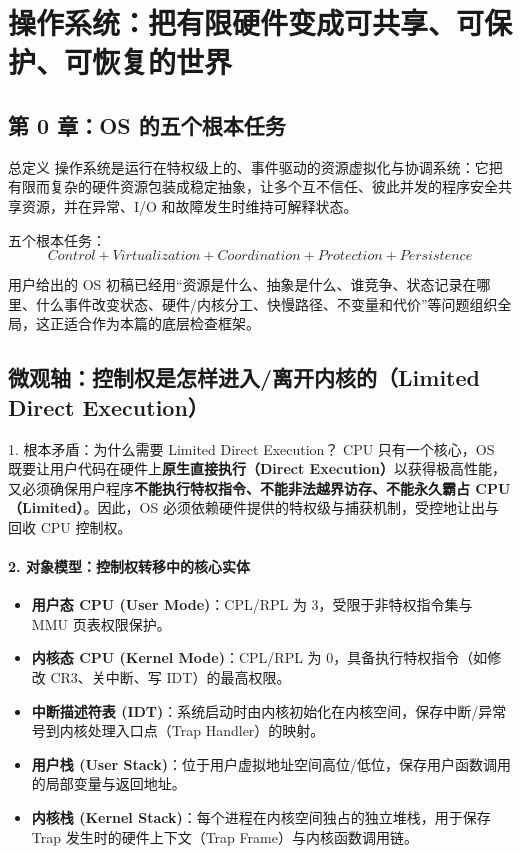 \documentclass[11pt,a4paper,openany]{ctexbook}
\newcommand{\key}[1]{\textbf{\color{deep}#1}}
\begin{document}
\chapter{操作系统：把有限硬件变成可共享、可保护、可恢复的世界}

\section{第 0 章：OS 的五个根本任务}
\begin{corebox}{总定义}
操作系统是运行在特权级上的、事件驱动的资源虚拟化与协调系统：它把有限而复杂的硬件资源包装成稳定抽象，让多个互不信任、彼此并发的程序安全共享资源，并在异常、I/O 和故障发生时维持可解释状态。
\end{corebox}

五个根本任务：
\[
\boxed{Control+Virtualization+Coordination+Protection+Persistence}
\]

用户给出的 OS 初稿已经用“资源是什么、抽象是什么、谁竞争、状态记录在哪里、什么事件改变状态、硬件/内核分工、快慢路径、不变量和代价”等问题组织全局，这正适合作为本篇的底层检查框架。

\section{微观轴：控制权是怎样进入/离开内核的（Limited Direct Execution）}

\begin{corebox}{1. 根本矛盾：为什么需要 Limited Direct Execution？}
CPU 只有一个核心，OS 既要让用户代码在硬件上\textbf{原生直接执行（Direct Execution）}以获得极高性能，又必须确保用户程序\textbf{不能执行特权指令、不能非法越界访存、不能永久霸占 CPU（Limited）}。因此，OS 必须依赖硬件提供的特权级与捕获机制，受控地让出与回收 CPU 控制权。
\end{corebox}

\subsubsection*{2. 对象模型：控制权转移中的核心实体}
\begin{itemize}
  \item \key{用户态 CPU (User Mode)}：CPL/RPL 为 3，受限于非特权指令集与 MMU 页表权限保护。
  \item \key{内核态 CPU (Kernel Mode)}：CPL/RPL 为 0，具备执行特权指令（如修改 CR3、关中断、写 IDT）的最高权限。
  \item \key{中断描述符表 (IDT)}：系统启动时由内核初始化在内核空间，保存中断/异常号到内核处理入口点（Trap Handler）的映射。
  \item \key{用户栈 (User Stack)}：位于用户虚拟地址空间高位/低位，保存用户函数调用的局部变量与返回地址。
  \item \key{内核栈 (Kernel Stack)}：每个进程在内核空间独占的独立堆栈，用于保存 Trap 发生时的硬件上下文（Trap Frame）与内核函数调用链。
\end{itemize}
\end{document}
